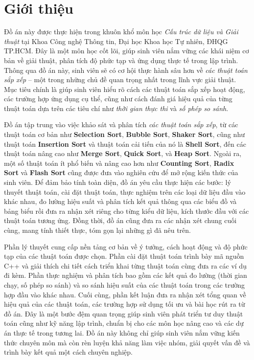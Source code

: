 \section{Giới thiệu}

Đồ án này được thực hiện trong khuôn khổ môn học \textit{Cấu trúc dữ liệu 
và Giải thuật} tại Khoa Công nghệ Thông tin, Đại học Khoa học Tự nhiên, 
ĐHQG TP.HCM. Đây là một môn học cốt lõi, giúp sinh viên nắm vững các 
khái niệm cơ bản về giải thuật, phân tích độ phức tạp và ứng dụng 
thực tế trong lập trình. Thông qua đồ án này, sinh viên sẽ có cơ hội 
thực hành sâu hơn về \textit{các thuật toán sắp xếp} – một trong những chủ đề 
quan trọng nhất trong lĩnh vực giải thuật. Mục tiêu chính là giúp 
sinh viên hiểu rõ cách các thuật toán sắp xếp hoạt động, các trường hợp 
ứng dụng cụ thể, cũng như cách đánh giá hiệu quả của từng thuật toán 
dựa trên các tiêu chí như \textit{thời gian thực thi} và \textit{số phép so sánh}.

Đồ án tập trung vào việc khảo sát và phân tích \textit{các thuật toán sắp xếp}, 
từ các thuật toán cơ bản như \textbf{Selection Sort}, \textbf{Bubble Sort}, 
\textbf{Shaker Sort}, cũng như thuật toán \textbf{Insertion Sort} và 
thuật toán cải tiến của nó là \textbf{Shell Sort}, đến các thuật toán 
nâng cao như \textbf{Merge Sort}, \textbf{Quick Sort}, và \textbf{Heap Sort}. 
Ngoài ra, một số thuật toán ít phổ biến và nâng cao hơn như 
\textbf{Counting Sort}, \textbf{Radix Sort} và \textbf{Flash Sort} 
cũng được đưa vào nghiên cứu để mở rộng kiến thức của sinh viên. Để 
đảm bảo tính toàn diện, đồ án yêu cầu thực hiện các bước: lý thuyết 
thuật toán, cài đặt thuật toán, thực nghiệm trên các loại dữ liệu 
đầu vào khác nhau, đo lường hiệu suất và phân tích kết quả thông qua 
các biểu đồ và bảng biểu rồi đưa ra nhận xét riêng cho từng kiểu dữ liệu, 
kích thước đầu với các thuật toán tương ứng. Đồng thời, đồ án cũng 
đưa ra các nhận xét chung cuối cùng, mang tính thiết thực, tóm gọn 
lại những gì đã nêu trên.

Phần lý thuyết cung cấp nền tảng cơ bản về ý tưởng, cách hoạt động và 
độ phức tạp của các thuật toán được chọn. Phần cài đặt thuật toán 
trình bày mã nguồn C++ và giải thích chi tiết cách triển khai từng 
thuật toán cùng đưa ra các ví dụ đi kèm. Phần thực nghiệm và phân tích 
bao gồm các kết quả đo lường (thời gian chạy, số phép so sánh) và so sánh 
hiệu suất của các thuật toán trong các trường hợp đầu vào khác nhau. 
Cuối cùng, phần kết luận đưa ra nhận xét tổng quan về hiệu quả của các 
thuật toán, các trường hợp sử dụng tối ưu và bài học rút ra từ đồ án. 
Đây là một bước đệm quan trọng giúp sinh viên phát triển tư duy thuật toán 
cũng như kỹ năng lập trình, chuẩn bị cho các môn học nâng cao và các dự án 
thực tế trong tương lai. Đồ án này không chỉ giúp sinh viên nắm vững 
kiến thức chuyên môn mà còn rèn luyện khả năng làm việc nhóm, giải quyết 
vấn đề và trình bày kết quả một cách chuyên nghiệp.